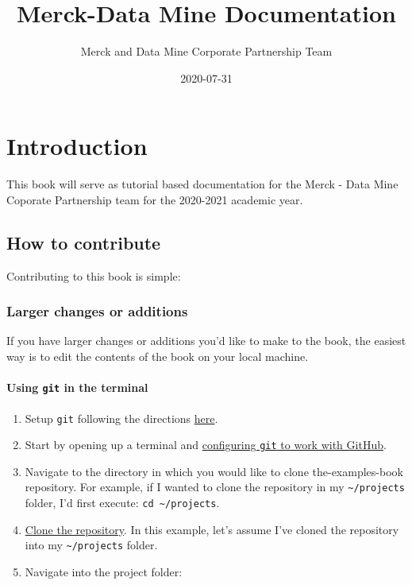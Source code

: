 \documentclass[]{book}
\title{Merck-Data Mine Documentation}
\author{Merck and Data Mine Corporate Partnership Team}
\date{2020-07-31}
\providecommand{\tightlist}{%
  \setlength{\itemsep}{0pt}\setlength{\parskip}{0pt}}
\begin{document}
\maketitle

{
\setcounter{tocdepth}{1}
\tableofcontents
}
\chapter{Introduction}\label{introduction}

This book will serve as tutorial based documentation for the Merck -
Data Mine Coporate Partnership team for the 2020-2021 academic year.

\section{How to contribute}\label{how-to-contribute}

Contributing to this book is simple:

\subsection{Larger changes or
additions}\label{larger-changes-or-additions}

If you have larger changes or additions you'd like to make to the book,
the easiest way is to edit the contents of the book on your local
machine.

\subsubsection{\texorpdfstring{Using \texttt{git} in the
terminal}{Using git in the terminal}}\label{using-git-in-the-terminal}

\begin{enumerate}
\def\labelenumi{\arabic{enumi}.}
\tightlist
\item
  Setup \texttt{git} following the directions
  \protect\hyperlink{git-install}{here}.
\item
  Start by opening up a terminal and
  \protect\hyperlink{configure-git}{configuring \texttt{git} to work
  with GitHub}.
\item
  Navigate to the directory in which you would like to clone
  the-examples-book repository. For example, if I wanted to clone the
  repository in my \texttt{\textasciitilde{}/projects} folder, I'd first
  execute: \texttt{cd\ \textasciitilde{}/projects}.
\item
  \protect\hyperlink{git-clone-repository}{Clone the repository}. In
  this example, let's assume I've cloned the repository into my
  \texttt{\textasciitilde{}/projects} folder.
\item
  Navigate into the project folder:
\end{enumerate}
\end{document}
